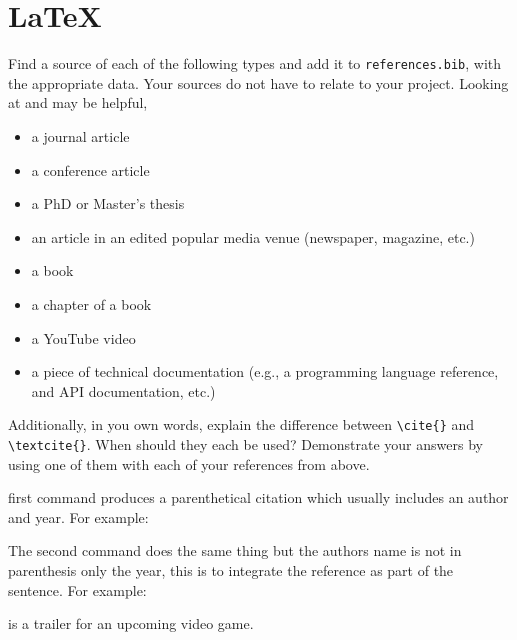 \documentclass[10pt,twocolumn]{article}
\begin{document}
\section{\LaTeX}

Find a source of each of the following types and add it to \texttt{references.bib}, with the appropriate data. Your sources do not have to relate to your project. Looking at \textcite{OverleafBibliographyManagement} and \textcite{WikipediaBibtex} may be helpful,

\begin{itemize}
\item a journal article
\item a conference article
\item a PhD or Master's thesis
\item an article in an edited popular media venue (newspaper, magazine, etc.)
\item a book
\item a chapter of a book
\item a YouTube video
\item a piece of technical documentation (e.g., a programming language reference, and API documentation, etc.)
\end{itemize}

Additionally, in you own words, explain the difference between \texttt{{\textbackslash}cite\{\}} and \texttt{{\textbackslash}textcite\{\}}. When should they each be used? Demonstrate your answers by using one of them with each of your references from above.

\medskip
first command produces a parenthetical citation which usually includes an author and year. For example:

\cite{Darroch.2017}

The second command does the same thing but the authors name is not in parenthesis only the year, this is to integrate the reference as part of the sentence. For example:

\textcite{youtube} is a trailer for an upcoming video game.
\medskip

\printbibliography
\end{document}
